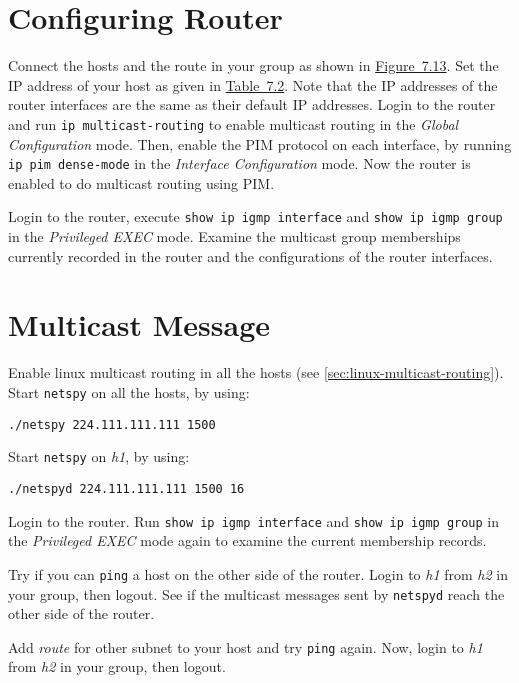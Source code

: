 \documentclass{../UTNetLab}
\begin{document}
\section{Configuring Router}
\label{sec:config-router}
    Connect the hosts and the route in your group as shown in \hyperref[fig:7.13]{Figure~7.13}.
    Set the IP address of your host as given in \hyperref[tab:7.2]{Table~7.2}.
    Note that the IP addresses of the router interfaces are the same as their default IP addresses.
    Login to the router and run \lstinline{ip multicast-routing} to enable multicast routing in the \textit{Global Configuration} mode.
    Then, enable the PIM protocol on each interface, by running \lstinline{ip pim dense-mode} in the \textit{Interface Configuration} mode.
    Now the router is enabled to do multicast routing using PIM.

    Login to the router, execute \lstinline{show ip igmp interface} and \lstinline{show ip igmp group} in the \textit{Privileged EXEC} mode.
    Examine the multicast group memberships currently recorded in the router and the configurations of the router interfaces.

\section{Multicast Message}
    Enable linux multicast routing in all the hosts (see \autoref{sec:linux-multicast-routing}).\\
    Start \lstinline{netspy} on all the hosts, by using:
    \begin{lstlisting}
./netspy 224.111.111.111 1500
    \end{lstlisting}
    Start \lstinline{netspy} on \textit{h1}, by using:
    \begin{lstlisting}
./netspyd 224.111.111.111 1500 16
    \end{lstlisting}
    
    Login to the router.
    Run \lstinline[language={cisco}]{show ip igmp interface} and \lstinline[language={cisco}]{show ip igmp group} in the \textit{Privileged EXEC} mode again to examine the current membership records.

    Try if you can \lstinline{ping} a host on the other side of the router.
    Login to \textit{h1} from \textit{h2} in your group, then logout.
    See if the multicast messages sent by \lstinline{netspyd} reach the other side of the router.

    Add \textit{route} for other subnet to your host and try \lstinline{ping} again.
    Now, login to \textit{h1} from \textit{h2} in your group, then logout.
    
\end{document}
